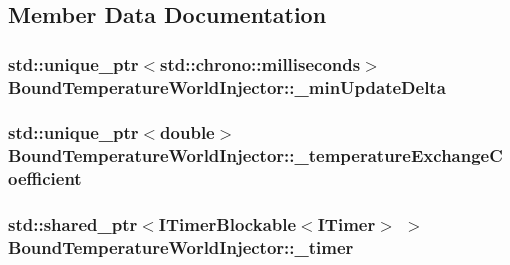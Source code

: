\subsection{Member Data Documentation}
\hypertarget{class_bound_temperature_world_injector_a30845955fe87ca6cb33993e98b222aa4}{
\subsubsection[{\-\_\-min\-Update\-Delta}]{\setlength{\rightskip}{0pt plus 5cm}std\-::unique\-\_\-ptr$<$std\-::chrono\-::milliseconds$>$ Bound\-Temperature\-World\-Injector\-::\-\_\-min\-Update\-Delta\hspace{0.3cm}{\ttfamily [protected]}}}\label{class_bound_temperature_world_injector_a30845955fe87ca6cb33993e98b222aa4}
\hypertarget{class_bound_temperature_world_injector_ab9a509b3b413ac1ac3825413c8d5d61f}{
\subsubsection[{\-\_\-temperature\-Exchange\-Coefficient}]{\setlength{\rightskip}{0pt plus 5cm}std\-::unique\-\_\-ptr$<$double$>$ Bound\-Temperature\-World\-Injector\-::\-\_\-temperature\-Exchange\-Coefficient\hspace{0.3cm}{\ttfamily [protected]}}}\label{class_bound_temperature_world_injector_ab9a509b3b413ac1ac3825413c8d5d61f}
\hypertarget{class_bound_temperature_world_injector_aabf0e33720ede845f154e57f7cd7edfb}{
\subsubsection[{\-\_\-timer}]{\setlength{\rightskip}{0pt plus 5cm}std\-::shared\-\_\-ptr$<${\bf I\-Timer\-Blockable}$<${\bf I\-Timer}$>$ $>$ Bound\-Temperature\-World\-Injector\-::\-\_\-timer\hspace{0.3cm}{\ttfamily [protected]}}}\label{class_bound_temperature_world_injector_aabf0e33720ede845f154e57f7cd7edfb}
